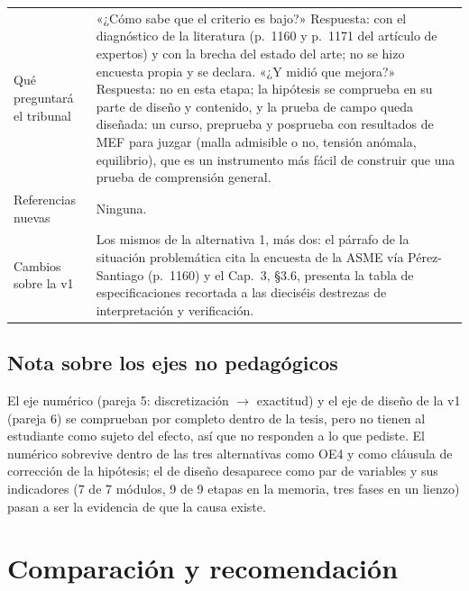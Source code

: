 \documentclass[11pt,a4paper]{article}
\begin{document}
\begin{longtable}{L{3.4cm}L{12.4cm}}
Qué preguntará el tribunal & «¿Cómo sabe que el criterio es bajo?» Respuesta: con el diagnóstico de la literatura (p.~1160 y p.~1171 del artículo de expertos) y con la brecha del estado del arte; no se hizo encuesta propia y se declara. «¿Y midió que mejora?» Respuesta: no en esta etapa; la hipótesis se comprueba en su parte de diseño y contenido, y la prueba de campo queda diseñada: un curso, preprueba y posprueba con resultados de MEF para juzgar (malla admisible o no, tensión anómala, equilibrio), que es un instrumento más fácil de construir que una prueba de comprensión general. \\
Referencias nuevas & Ninguna. \\
Cambios sobre la v1 & Los mismos de la alternativa 1, más dos: el párrafo de la situación problemática cita la encuesta de la ASME vía Pérez-Santiago (p.~1160) y el Cap.~3, §3.6, presenta la tabla de especificaciones recortada a las dieciséis destrezas de interpretación y verificación. \\
\bottomrule
\end{longtable}

\subsection*{Nota sobre los ejes no pedagógicos}

El eje numérico (pareja 5: discretización $\to$ exactitud) y el eje de diseño de la v1 (pareja 6) se comprueban por completo dentro de la tesis, pero no tienen al estudiante como sujeto del efecto, así que no responden a lo que pediste. El numérico sobrevive dentro de las tres alternativas como OE4 y como cláusula de corrección de la hipótesis; el de diseño desaparece como par de variables y sus indicadores (7 de 7 módulos, 9 de 9 etapas en la memoria, tres fases en un lienzo) pasan a ser la evidencia de que la causa existe.

\section{Comparación y recomendación}
\end{document}
